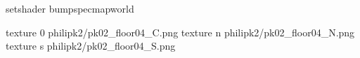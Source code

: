 setshader bumpspecmapworld

texture 0 philipk2/pk02_floor04_C.png
texture n philipk2/pk02_floor04_N.png
texture s philipk2/pk02_floor04_S.png

